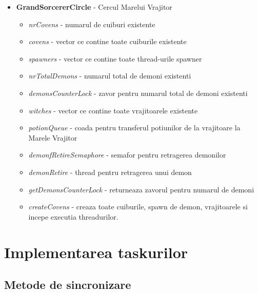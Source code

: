 \documentclass{article}
\begin{document}
\begin{itemize}
\begin{itemize}
\begin{itemize}
                  \end{itemize}
            \end{itemize}
            \item \textbf{GrandSorcererCircle} - Cercul Marelui Vrajitor
                \begin{itemize}
                    \item \textit{nrCovens} - numarul de cuiburi existente
                    \item \textit{covens} - vector ce contine toate cuiburile existente
                    \item \textit{spawners} - vector ce contine toate thread-urile spawner
                    \item \textit{nrTotalDemons} - numarul total de demoni existenti
                    \item \textit{demonsCounterLock} - zavor pentru numarul total de demoni existenti
                    \item \textit{witches} - vector ce contine toate vrajitoarele existente
                    \item \textit{potionQueue} - coada pentru transferul potiunilor de la vrajitoare la Marele Vrajitor
                    \item \textit{demonfRetireSemaphore} - semafor pentru retragerea demonilor
                    \item \textit{demonRetire} - thread pentru retragerea unui demon
                    \item \textit{getDemonsCounterLock} - returneaza zavorul pentru numarul de demoni
                    \item \textit{createCovens} - creaza toate cuiburile, spawn de demon, vrajitoarele si incepe executia threadurilor.
                \end{itemize}
                
        \end{itemize}
    
    
    
 \section{\textbf{Implementarea taskurilor}}
 
   \subsection {Metode de sincronizare}
\end{document}
